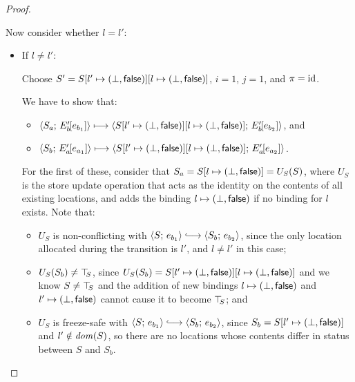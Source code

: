 \begin{proof}
\begin{enumerate}
\begin{enumerate}
      Now consider whether $l = l'$:
      \begin{itemize}
        \item If $l \neq l'$:

          Choose $S' =
          S[l' \mapsto (\bot, \textsf{false})][l \mapsto (\bot, \textsf{false})]$,
          $i = 1$, $j = 1$, and $\pi = \mathrm{id}$.

          We have to show that:
          \begin{itemize}
          \item $\langle S_a;\, E'_b\hspace{-1mm}\left[e_{b_1}\right] \rangle \longmapsto
            \langle S[l' \mapsto (\bot, \textsf{false})][l \mapsto (\bot, \textsf{false})];\, E'_b\hspace{-1mm}\left[e_{b_2}\right] \rangle$,
            and
          \item $\langle S_b;\, E'_a\hspace{-1mm}\left[e_{a_1}\right] \rangle \longmapsto
            \langle S[l' \mapsto (\bot, \textsf{false})][l \mapsto (\bot, \textsf{false})];\, E'_a\hspace{-1mm}\left[e_{a_2}\right] \rangle$.
          \end{itemize}

          For the first of these, consider that $S_a =
          S[l \mapsto (\bot, \textsf{false})] = U_S(S)$, where $U_S$ is
          the store update operation that acts as the identity on the
          contents of all existing locations, and adds the binding
          $l \mapsto (\bot, \textsf{false})$ if no binding for $l$
          exists.  Note that:
          \begin{itemize}
          \item $U_S$ is non-conflicting with $\config{S}{e_{b_1}}
            \parstepsto \config{S_b}{e_{b_2}}$, since the only
            location allocated during the transition is $l'$, and $l
            \neq l'$ in this case;
          \item $U_S(S_b) \neq \top\hspace{-0.85mm}_{S}$, since $U_S(S_b) =
            S[l' \mapsto (\bot, \textsf{false})][l \mapsto (\bot, \textsf{false})]$
            and we know $S \neq \top\hspace{-0.85mm}_{S}$ and the addition of new
            bindings $l \mapsto (\bot, \textsf{false})$ and
            $l' \mapsto (\bot, \textsf{false})$ cannot cause it to
            become $\top\hspace{-0.85mm}_{S}$; and
          \item $U_S$ is freeze-safe with $\config{S}{e_{b_1}}
            \parstepsto \config{S_b}{e_{b_2}}$, since $S_b =
            S[l' \mapsto (\bot, \textsf{false})]$ and $l' \notin \mathit{dom}(S)$,
            so there are no locations whose contents differ in status
            between $S$ and $S_b$.
          \end{itemize}


\end{itemize}
\end{enumerate}
\end{enumerate}
\end{proof}
